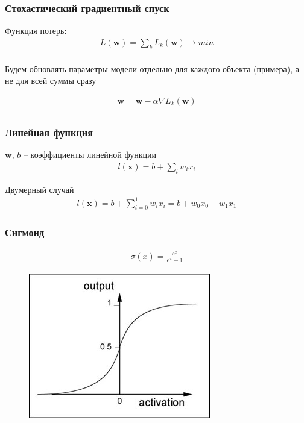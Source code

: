 \documentclass[fullscreen=true, bookmarks=false]{beamer} %
\begin{document}

\begin{frame}{}
 \frametitle{Стохастический градиентный спуск}
 
 Функция потерь:
 \begin{gather*}
 \nonumber
 L(\bm{w}) = \sum_k L_k(\bm{w}) \rightarrow min\\
 \end{gather*}

Будем обновлять параметры модели отдельно для каждого объекта (примера), а не для всей суммы сразу

\begin{gather*}
\nonumber
 \bm{w} = \bm{w} - \alpha \nabla L_k(\bm{w})\\
\end{gather*}

\end{frame}


\begin{frame}{}
 \frametitle{Линейная функция}
 $\bm{w}$, $b$ -- коэффициенты линейной функции
\begin{gather*}
\nonumber
l(\bm{x}) = b + \sum_i w_i x_i
\end{gather*}

Двумерный случай
\begin{gather*}
\nonumber
l(\bm{x}) = b + \sum_{i=0}^1 w_i x_i= b + w_0 x_0 + w_1 x_1
\end{gather*}

\end{frame}


\begin{frame}{}
 \frametitle{Сигмоид}
\begin{gather*}
\nonumber
\sigma(x) = \frac{e^x}{e^x + 1}
\end{gather*}
\begin{figure}[]
\includegraphics[scale=0.5]{sigmoid} 
\end{figure}

\end{frame}
\end{document}
